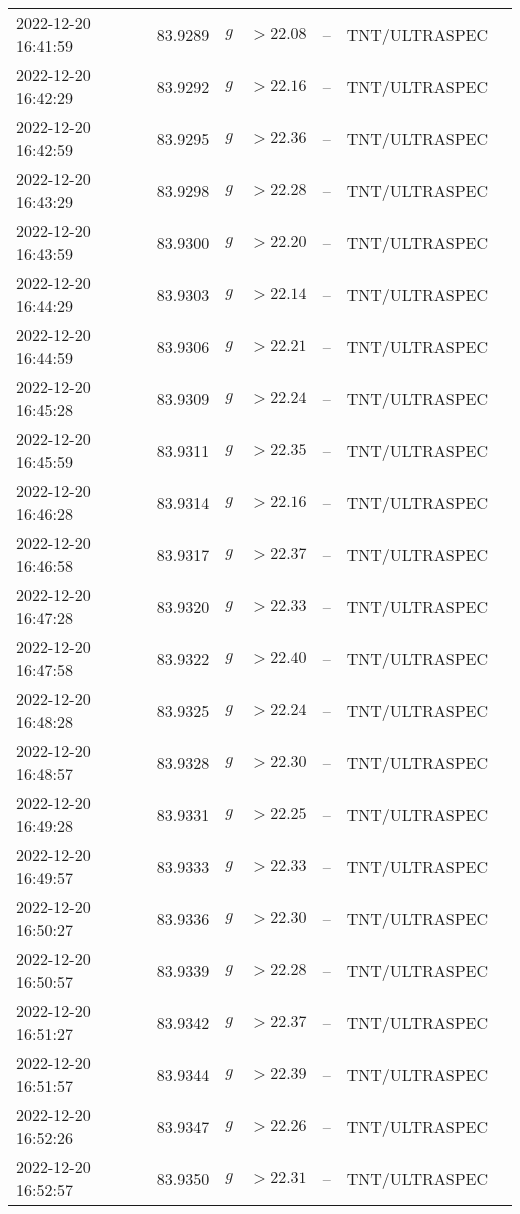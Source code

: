 \documentclass{nature_plusfigure}
\begin{document}
\begin{supplement}
\begin{center}
\begin{longtable}{lllllll}
2022-12-20 16:41:59 & 83.9289 & $g$ & $>22.08$ & -- & TNT/ULTRASPEC &  \\ 
2022-12-20 16:42:29 & 83.9292 & $g$ & $>22.16$ & -- & TNT/ULTRASPEC &  \\ 
2022-12-20 16:42:59 & 83.9295 & $g$ & $>22.36$ & -- & TNT/ULTRASPEC &  \\ 
2022-12-20 16:43:29 & 83.9298 & $g$ & $>22.28$ & -- & TNT/ULTRASPEC &  \\ 
2022-12-20 16:43:59 & 83.9300 & $g$ & $>22.20$ & -- & TNT/ULTRASPEC &  \\ 
2022-12-20 16:44:29 & 83.9303 & $g$ & $>22.14$ & -- & TNT/ULTRASPEC &  \\ 
2022-12-20 16:44:59 & 83.9306 & $g$ & $>22.21$ & -- & TNT/ULTRASPEC &  \\ 
2022-12-20 16:45:28 & 83.9309 & $g$ & $>22.24$ & -- & TNT/ULTRASPEC &  \\ 
2022-12-20 16:45:59 & 83.9311 & $g$ & $>22.35$ & -- & TNT/ULTRASPEC &  \\ 
2022-12-20 16:46:28 & 83.9314 & $g$ & $>22.16$ & -- & TNT/ULTRASPEC &  \\ 
2022-12-20 16:46:58 & 83.9317 & $g$ & $>22.37$ & -- & TNT/ULTRASPEC &  \\ 
2022-12-20 16:47:28 & 83.9320 & $g$ & $>22.33$ & -- & TNT/ULTRASPEC &  \\ 
2022-12-20 16:47:58 & 83.9322 & $g$ & $>22.40$ & -- & TNT/ULTRASPEC &  \\ 
2022-12-20 16:48:28 & 83.9325 & $g$ & $>22.24$ & -- & TNT/ULTRASPEC &  \\ 
2022-12-20 16:48:57 & 83.9328 & $g$ & $>22.30$ & -- & TNT/ULTRASPEC &  \\ 
2022-12-20 16:49:28 & 83.9331 & $g$ & $>22.25$ & -- & TNT/ULTRASPEC &  \\ 
2022-12-20 16:49:57 & 83.9333 & $g$ & $>22.33$ & -- & TNT/ULTRASPEC &  \\ 
2022-12-20 16:50:27 & 83.9336 & $g$ & $>22.30$ & -- & TNT/ULTRASPEC &  \\ 
2022-12-20 16:50:57 & 83.9339 & $g$ & $>22.28$ & -- & TNT/ULTRASPEC &  \\ 
2022-12-20 16:51:27 & 83.9342 & $g$ & $>22.37$ & -- & TNT/ULTRASPEC &  \\ 
2022-12-20 16:51:57 & 83.9344 & $g$ & $>22.39$ & -- & TNT/ULTRASPEC &  \\ 
2022-12-20 16:52:26 & 83.9347 & $g$ & $>22.26$ & -- & TNT/ULTRASPEC &  \\ 
2022-12-20 16:52:57 & 83.9350 & $g$ & $>22.31$ & -- & TNT/ULTRASPEC &  \\ 

\end{longtable}
\end{center}
\end{supplement}
\end{document}
